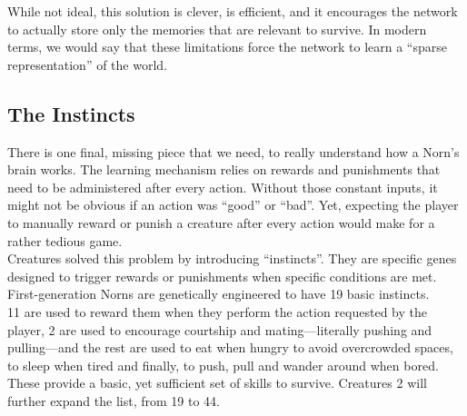 \documentclass[11pt,twoside,a4paper]{article}
\begin{document}
While not ideal, this solution is clever, is efficient, and it encourages the network to actually store only the memories that are relevant to survive. In modern terms, we would say that these limitations force the network to learn a “sparse representation” of the world.~\\

\subsection*{The Instincts}

There is one final, missing piece that we need, to really understand how a Norn’s brain works. The learning mechanism relies on rewards and punishments that need to be administered after every action. Without those constant inputs, it might not be obvious if an action was “good” or “bad”. Yet, expecting the player to manually reward or punish a creature after every action would make for a rather tedious game.~\\

Creatures solved this problem by introducing “instincts”. They are specific genes designed to trigger rewards or punishments when specific conditions are met.~\\

First-generation Norns are genetically engineered to have 19 basic instincts.~\\
11 are used to reward them when they perform the action requested by the player, 2 are used to encourage courtship and mating—literally pushing and pulling—and the rest are used to eat when hungry to avoid overcrowded spaces, to sleep when tired and finally, to push, pull and wander around when bored. These provide a basic, yet sufficient set of skills to survive. Creatures 2 will further expand the list, from 19 to 44.~\\
\end{document}
